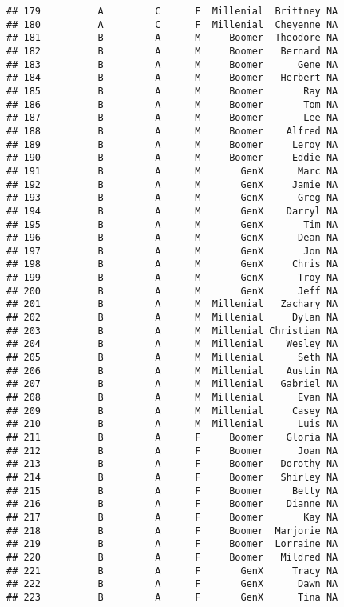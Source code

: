 \documentclass[
]{article}
\begin{document}
\begin{verbatim}
## 179          A         C      F  Millenial  Brittney NA
## 180          A         C      F  Millenial  Cheyenne NA
## 181          B         A      M     Boomer  Theodore NA
## 182          B         A      M     Boomer   Bernard NA
## 183          B         A      M     Boomer      Gene NA
## 184          B         A      M     Boomer   Herbert NA
## 185          B         A      M     Boomer       Ray NA
## 186          B         A      M     Boomer       Tom NA
## 187          B         A      M     Boomer       Lee NA
## 188          B         A      M     Boomer    Alfred NA
## 189          B         A      M     Boomer     Leroy NA
## 190          B         A      M     Boomer     Eddie NA
## 191          B         A      M       GenX      Marc NA
## 192          B         A      M       GenX     Jamie NA
## 193          B         A      M       GenX      Greg NA
## 194          B         A      M       GenX    Darryl NA
## 195          B         A      M       GenX       Tim NA
## 196          B         A      M       GenX      Dean NA
## 197          B         A      M       GenX       Jon NA
## 198          B         A      M       GenX     Chris NA
## 199          B         A      M       GenX      Troy NA
## 200          B         A      M       GenX      Jeff NA
## 201          B         A      M  Millenial   Zachary NA
## 202          B         A      M  Millenial     Dylan NA
## 203          B         A      M  Millenial Christian NA
## 204          B         A      M  Millenial    Wesley NA
## 205          B         A      M  Millenial      Seth NA
## 206          B         A      M  Millenial    Austin NA
## 207          B         A      M  Millenial   Gabriel NA
## 208          B         A      M  Millenial      Evan NA
## 209          B         A      M  Millenial     Casey NA
## 210          B         A      M  Millenial      Luis NA
## 211          B         A      F     Boomer    Gloria NA
## 212          B         A      F     Boomer      Joan NA
## 213          B         A      F     Boomer   Dorothy NA
## 214          B         A      F     Boomer   Shirley NA
## 215          B         A      F     Boomer     Betty NA
## 216          B         A      F     Boomer    Dianne NA
## 217          B         A      F     Boomer       Kay NA
## 218          B         A      F     Boomer  Marjorie NA
## 219          B         A      F     Boomer  Lorraine NA
## 220          B         A      F     Boomer   Mildred NA
## 221          B         A      F       GenX     Tracy NA
## 222          B         A      F       GenX      Dawn NA
## 223          B         A      F       GenX      Tina NA

\end{verbatim}
\end{document}
